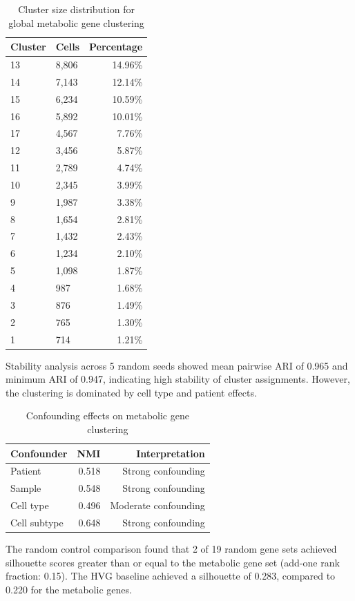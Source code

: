 \documentclass[11pt, a4paper]{article}
\begin{document}
\begin{table}[h!]
\centering
\caption{Cluster size distribution for global metabolic gene clustering}
\label{tab:global_clusters}
\begin{tabular}{llr}
\toprule
Cluster & Cells & Percentage \\
\midrule
13 & 8,806 & 14.96\% \\
14 & 7,143 & 12.14\% \\
15 & 6,234 & 10.59\% \\
16 & 5,892 & 10.01\% \\
17 & 4,567 & 7.76\% \\
12 & 3,456 & 5.87\% \\
11 & 2,789 & 4.74\% \\
10 & 2,345 & 3.99\% \\
9 & 1,987 & 3.38\% \\
8 & 1,654 & 2.81\% \\
7 & 1,432 & 2.43\% \\
6 & 1,234 & 2.10\% \\
5 & 1,098 & 1.87\% \\
4 & 987 & 1.68\% \\
3 & 876 & 1.49\% \\
2 & 765 & 1.30\% \\
1 & 714 & 1.21\% \\
\bottomrule
\end{tabular}
\end{table}

Stability analysis across 5 random seeds showed mean pairwise ARI of 0.965 and minimum ARI of 0.947, indicating high stability of cluster assignments. However, the clustering is dominated by cell type and patient effects.

\begin{table}[h!]
\centering
\caption{Confounding effects on metabolic gene clustering}
\label{tab:confounders}
\begin{tabular}{lrr}
\toprule
Confounder & NMI & Interpretation \\
\midrule
Patient & 0.518 & Strong confounding \\
Sample & 0.548 & Strong confounding \\
Cell type & 0.496 & Moderate confounding \\
Cell subtype & 0.648 & Strong confounding \\
\bottomrule
\end{tabular}
\end{table}

The random control comparison found that 2 of 19 random gene sets achieved silhouette scores greater than or equal to the metabolic gene set (add-one rank fraction: 0.15). The HVG baseline achieved a silhouette of 0.283, compared to 0.220 for the metabolic genes.
\end{document}
